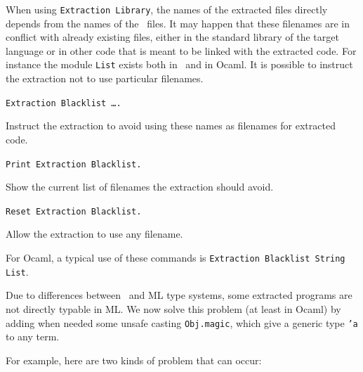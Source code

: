 
When using {\tt Extraction Library}, the names of the extracted files
directly depends from the names of the \Coq\ files. It may happen that
these filenames are in conflict with already existing files, 
either in the standard library of the target language or in other
code that is meant to be linked with the extracted code. 
For instance the module {\tt List} exists both in \Coq\ and in Ocaml.
It is possible to instruct the extraction not to use particular filenames.

\begin{description}
\item{\tt Extraction Blacklist \ident \ldots \ident.} ~\par
  Instruct the extraction to avoid using these names as filenames
  for extracted code. 
\item{\tt Print Extraction Blacklist.} ~\par
  Show the current list of filenames the extraction should avoid.
\item{\tt Reset Extraction Blacklist.} ~\par
  Allow the extraction to use any filename.
\end{description}

For Ocaml, a typical use of these commands is
{\tt Extraction Blacklist String List}.



Due to differences between \Coq\ and ML type systems, 
some extracted programs are not directly typable in ML. 
We now solve this problem (at least in Ocaml) by adding 
when needed some unsafe casting {\tt Obj.magic}, which give
a generic type {\tt 'a} to any term.

For example, here are two kinds of problem that can occur:

